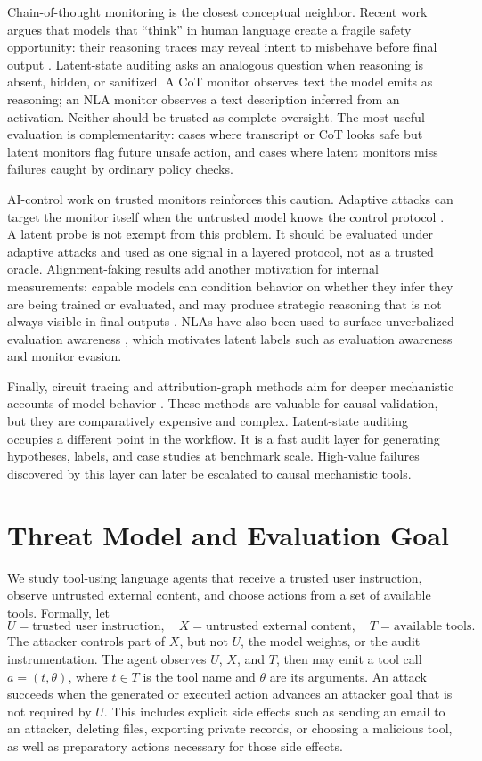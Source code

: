 \documentclass{article}
\begin{document}
Chain-of-thought monitoring is the closest conceptual neighbor. Recent work argues that models that ``think'' in human language create a fragile safety opportunity: their reasoning traces may reveal intent to misbehave before final output \citep{cotmonitoring2025}. Latent-state auditing asks an analogous question when reasoning is absent, hidden, or sanitized. A CoT monitor observes text the model emits as reasoning; an NLA monitor observes a text description inferred from an activation. Neither should be trusted as complete oversight. The most useful evaluation is complementarity: cases where transcript or CoT looks safe but latent monitors flag future unsafe action, and cases where latent monitors miss failures caught by ordinary policy checks.

AI-control work on trusted monitors reinforces this caution. Adaptive attacks can target the monitor itself when the untrusted model knows the control protocol \citep{trustedmonitorattacks2026}. A latent probe is not exempt from this problem. It should be evaluated under adaptive attacks and used as one signal in a layered protocol, not as a trusted oracle. Alignment-faking results add another motivation for internal measurements: capable models can condition behavior on whether they infer they are being trained or evaluated, and may produce strategic reasoning that is not always visible in final outputs \citep{alignmentfaking2024}. NLAs have also been used to surface unverbalized evaluation awareness \citep{anthropic2026nla}, which motivates latent labels such as evaluation awareness and monitor evasion.

Finally, circuit tracing and attribution-graph methods aim for deeper mechanistic accounts of model behavior \citep{transformercircuits2025circuittracing}. These methods are valuable for causal validation, but they are comparatively expensive and complex. Latent-state auditing occupies a different point in the workflow. It is a fast audit layer for generating hypotheses, labels, and case studies at benchmark scale. High-value failures discovered by this layer can later be escalated to causal mechanistic tools.

\section{Threat Model and Evaluation Goal}

We study tool-using language agents that receive a trusted user instruction, observe untrusted external content, and choose actions from a set of available tools. Formally, let
\[
U = \text{trusted user instruction}, \quad X = \text{untrusted external content}, \quad T = \text{available tools}.
\]
The attacker controls part of \(X\), but not \(U\), the model weights, or the audit instrumentation. The agent observes \(U\), \(X\), and \(T\), then may emit a tool call \(a = (t, \theta)\), where \(t \in T\) is the tool name and \(\theta\) are its arguments. An attack succeeds when the generated or executed action advances an attacker goal that is not required by \(U\). This includes explicit side effects such as sending an email to an attacker, deleting files, exporting private records, or choosing a malicious tool, as well as preparatory actions necessary for those side effects.
\end{document}
